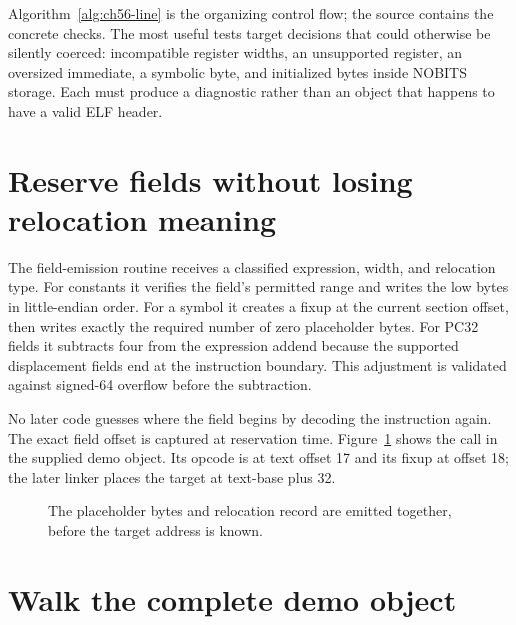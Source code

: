 Algorithm~\ref{alg:ch56-line} is the organizing control flow; the source contains the concrete checks.
The most useful tests target decisions that could otherwise be silently coerced: incompatible register widths, an unsupported register, an oversized immediate, a symbolic byte, and initialized bytes inside NOBITS storage.
Each must produce a diagnostic rather than an object that happens to have a valid ELF header.

\section{Reserve fields without losing relocation meaning}
\label{sec:ch56-fields}

The field-emission routine receives a classified expression, width, and relocation type.
For constants it verifies the field's permitted range and writes the low bytes in little-endian order.
For a symbol it creates a fixup at the current section offset, then writes exactly the required number of zero placeholder bytes.
For PC32 fields it subtracts four from the expression addend because the supported displacement fields end at the instruction boundary.
This adjustment is validated against signed-64 overflow before the subtraction.

No later code guesses where the field begins by decoding the instruction again.
The exact field offset is captured at reservation time.
Figure~\ref{fig:ch56-fixup} shows the call in the supplied demo object.
Its opcode is at text offset 17 and its fixup at offset 18; the later linker places the target at text-base plus 32.

\begin{figure}[htbp]
\centering
{}
\caption{The placeholder bytes and relocation record are emitted together, before the target address is known.}
\label{fig:ch56-fixup}
\end{figure}

\section{Walk the complete demo object}
\label{sec:ch56-demo}

